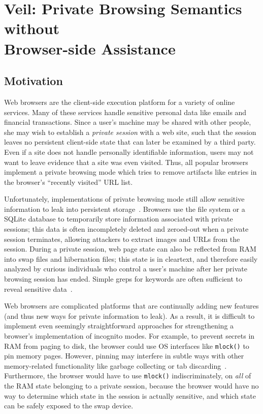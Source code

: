 \section[Veil: Private Browsing Semantics without Browser-side Assistance]{Veil: Private Browsing Semantics without \\ Browser-side Assistance}
\label{chap:veil}

\subsection{Motivation}
Web browsers are the client-side execution platform
for a variety of online services. Many of these
services handle sensitive personal data like emails
and financial transactions. Since a user's machine
may be shared with other people, she may wish to
establish a \emph{private session} with a web site,
such that the session leaves no persistent
client-side state that can later be examined by a
third party. Even if a site does not handle
personally identifiable information, users may
not want to leave evidence that a site was even
visited. Thus, all popular browsers implement a
private browsing mode which tries to remove
artifacts like entries in the browser's ``recently
visited'' URL list.

Unfortunately, implementations of private browsing
mode still allow sensitive information to leak into
persistent storage~\cite{aggarwal10,dt2016,magnetForensicsChrome,ohana13}.
Browsers use the file system or a SQLite database
to temporarily store information associated with private
sessions; this data is often incompletely deleted
and zeroed-out when a private session terminates,
allowing attackers to extract images and URLs from
the session. During a private session, web page
state can also be reflected from RAM into swap
files and hibernation files; this state is in cleartext,
and therefore easily analyzed by curious individuals
who control a user's machine after her private
browsing session has ended. Simple greps for
keywords are often sufficient to reveal sensitive
data~\cite{aggarwal10,dt2016}.

Web browsers are complicated platforms that are
continually adding new features (and thus new ways
for private information to leak). As a result, it is
difficult to implement even seemingly straightforward
approaches for strengthening a browser's implementation
of incognito modes. For example, to prevent secrets in
RAM from paging to disk, the browser could use OS
interfaces like \texttt{mlock()} to pin memory pages.
However, pinning may interfere in subtle ways with other
memory-related functionality like garbage collecting or
tab discarding~\cite{tabDiscarding}.
Furthermore, the browser would have to use \texttt{mlock()}
indiscriminately, on \textit{all} of the RAM state
belonging to a private session, because the browser would
have no way to determine which state in the session is
actually sensitive, and which state can be safely
exposed to the swap device.

